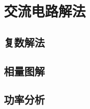 

\section{交流电路解法}\label{21-3}

\subsection{复数解法}\label{21-3-1}

\subsection{相量图解}\label{21-3-2}

\subsection{功率分析}\label{21-3-3}